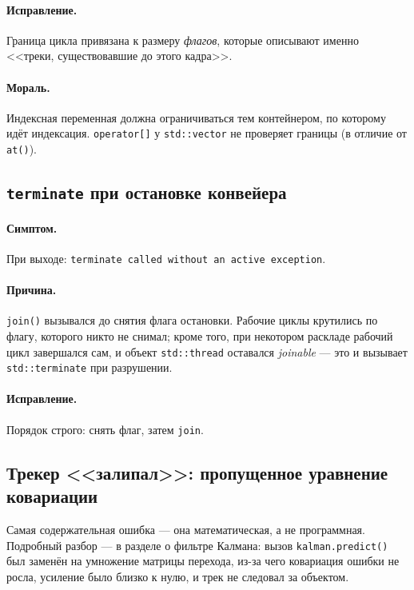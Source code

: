 \documentclass[11pt,a4paper]{article}
\theoremstyle{definition}
\theoremstyle{remark}
\begin{document}
\paragraph{Исправление.} Граница цикла привязана к размеру \emph{флагов},
которые описывают именно <<треки, существовавшие до этого кадра>>.

\paragraph{Мораль.} Индексная переменная должна ограничиваться тем
контейнером, по которому идёт индексация. \texttt{operator[]} у
\texttt{std::vector} не проверяет границы (в отличие от \texttt{at()}).

\subsection{\texttt{terminate} при остановке конвейера}

\paragraph{Симптом.} При выходе: \texttt{terminate called without an active
exception}.

\paragraph{Причина.} \texttt{join()} вызывался до снятия флага остановки.
Рабочие циклы крутились по флагу, которого никто не снимал; кроме того, при
некотором раскладе рабочий цикл завершался сам, и объект
\texttt{std::thread} оставался \emph{joinable} --- это и вызывает
\texttt{std::terminate} при разрушении.

\paragraph{Исправление.} Порядок строго: снять флаг, затем \texttt{join}.

\subsection{Трекер <<залипал>>: пропущенное уравнение ковариации}

Самая содержательная ошибка --- она математическая, а не программная.
Подробный разбор --- в разделе о фильтре Калмана: вызов
\texttt{kalman.predict()} был заменён на умножение матрицы перехода, из-за
чего ковариация ошибки не росла, усиление было близко к нулю, и трек не
следовал за объектом.
\end{document}
